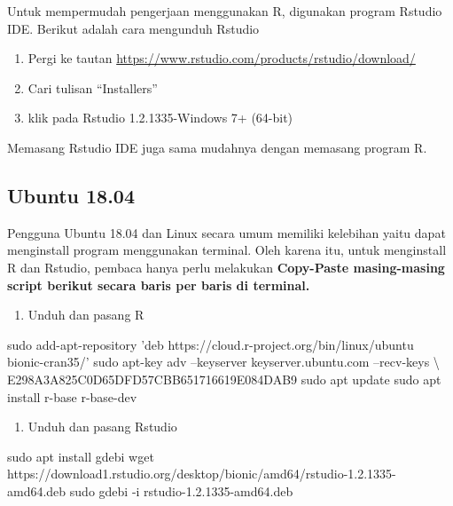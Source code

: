 \documentclass[]{book}
\newenvironment{Shaded}{\begin{snugshade}}{\end{snugshade}}
\newcommand{\StringTok}[1]{\textcolor[rgb]{0.31,0.60,0.02}{#1}}
\newcommand{\FunctionTok}[1]{\textcolor[rgb]{0.00,0.00,0.00}{#1}}
\newcommand{\NormalTok}[1]{#1}
\providecommand{\tightlist}{%
  \setlength{\itemsep}{0pt}\setlength{\parskip}{0pt}}
\begin{document}
Untuk mempermudah pengerjaan menggunakan R, digunakan program Rstudio
IDE. Berikut adalah cara mengunduh Rstudio

\begin{enumerate}
\def\labelenumi{\arabic{enumi}.}
\tightlist
\item
  Pergi ke tautan
  \url{https://www.rstudio.com/products/rstudio/download/}
\item
  Cari tulisan ``Installers''
\item
  klik pada Rstudio 1.2.1335-Windows 7+ (64-bit)
\end{enumerate}

Memasang Rstudio IDE juga sama mudahnya dengan memasang program R.

\subsection*{Ubuntu 18.04}\label{ubuntu-18.04}

Pengguna Ubuntu 18.04 dan Linux secara umum memiliki kelebihan yaitu
dapat menginstall program menggunakan terminal. Oleh karena itu, untuk
menginstall R dan Rstudio, pembaca hanya perlu melakukan
\textbf{Copy-Paste masing-masing script berikut secara baris per baris
di terminal.}

\begin{enumerate}
\def\labelenumi{\arabic{enumi}.}
\tightlist
\item
  Unduh dan pasang R
\end{enumerate}

\begin{Shaded}
\begin{Highlighting}[]
\FunctionTok{sudo}\NormalTok{ add-apt-repository }\StringTok{'deb https://cloud.r-project.org/bin/linux/ubuntu bionic-cran35/'}
\FunctionTok{sudo}\NormalTok{ apt-key adv --keyserver keyserver.ubuntu.com --recv-keys \textbackslash{}}
\NormalTok{E298A3A825C0D65DFD57CBB651716619E084DAB9}
\FunctionTok{sudo}\NormalTok{ apt update}
\FunctionTok{sudo}\NormalTok{ apt install r-base r-base-dev}
\end{Highlighting}
\end{Shaded}

\begin{enumerate}
\def\labelenumi{\arabic{enumi}.}
\setcounter{enumi}{1}
\tightlist
\item
  Unduh dan pasang Rstudio
\end{enumerate}

\begin{Shaded}
\begin{Highlighting}[]
\FunctionTok{sudo}\NormalTok{ apt install gdebi}
\FunctionTok{wget}\NormalTok{ https://download1.rstudio.org/desktop/bionic/amd64/rstudio-1.2.1335-amd64.deb}
\FunctionTok{sudo}\NormalTok{ gdebi -i rstudio-1.2.1335-amd64.deb}
\end{Highlighting}
\end{Shaded}
\end{document}
